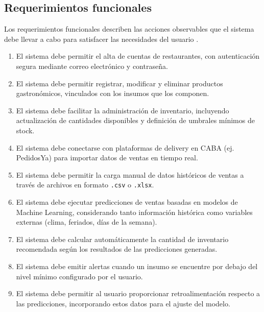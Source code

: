\subsection{Requerimientos funcionales}\label{sec:requerimientos-funcionales}
Los requerimientos funcionales describen las acciones observables que el sistema debe llevar a cabo para satisfacer las necesidades del usuario \parencite{ieee2008}.
\begin{enumerate}[label=\textbf{RF\arabic*}, leftmargin=2.5cm]
    \item El sistema debe permitir el alta de cuentas de restaurantes, con autenticación segura mediante correo electrónico y contraseña.
    \item El sistema debe permitir registrar, modificar y eliminar productos gastronómicos, vinculados con los insumos que los componen.
    \item El sistema debe facilitar la administración de inventario, incluyendo actualización de cantidades disponibles y definición de umbrales mínimos de stock.
    \item El sistema debe conectarse con plataformas de delivery en CABA (ej. PedidosYa) para importar datos de ventas en tiempo real.
    \item El sistema debe permitir la carga manual de datos históricos de ventas a través de archivos en formato \texttt{.csv} o \texttt{.xlsx}.
    \item El sistema debe ejecutar predicciones de ventas basadas en modelos de Machine Learning, considerando tanto información histórica como variables externas (clima, feriados, días de la semana).
    \item El sistema debe calcular automáticamente la cantidad de inventario recomendada según los resultados de las predicciones generadas.
    \item El sistema debe emitir alertas cuando un insumo se encuentre por debajo del nivel mínimo configurado por el usuario.
    \item El sistema debe permitir al usuario proporcionar retroalimentación respecto a las predicciones, incorporando estos datos para el ajuste del modelo.
\end{enumerate}

